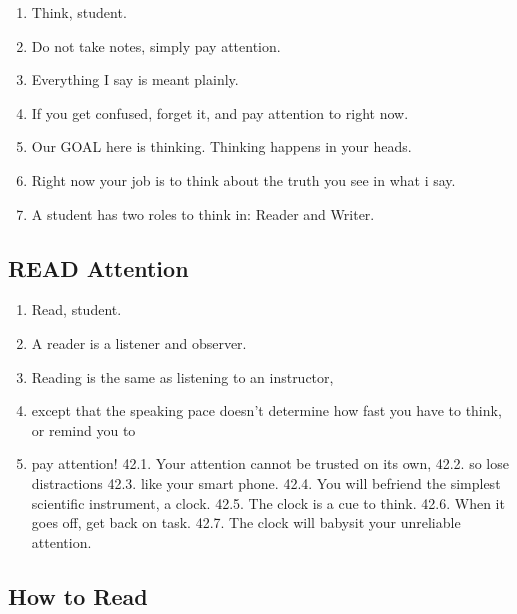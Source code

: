 \documentclass[
]{book}
\providecommand{\tightlist}{%
  \setlength{\itemsep}{0pt}\setlength{\parskip}{0pt}}
\begin{document}
\begin{enumerate}
\def\labelenumi{\arabic{enumi}.}
\setcounter{enumi}{30}
\tightlist
\item
  Think, student.
\item
  Do not take notes, simply pay attention.
\item
  Everything I say is meant plainly.
\item
  If you get confused, forget it, and pay attention to right now.
\item
  Our GOAL here is thinking. Thinking happens in your heads.
\item
  Right now your job is to think about the truth you see in what i say.
\item
  A student has two roles to think in: Reader and Writer.
\end{enumerate}

\hypertarget{read-attention}{%
\subsection{READ Attention}\label{read-attention}}

\begin{enumerate}
\def\labelenumi{\arabic{enumi}.}
\setcounter{enumi}{37}
\tightlist
\item
  Read, student.
\item
  A reader is a listener and observer.
\item
  Reading is the same as listening to an instructor,
\item
  except that the speaking pace doesn't determine how fast you have to think, or
  remind you to
\item
  pay attention!
  42.1. Your attention cannot be trusted on its own,
  42.2. so lose distractions
  42.3. like your smart phone.
  42.4. You will befriend the simplest scientific instrument, a clock.
  42.5. The clock is a cue to think.
  42.6. When it goes off, get back on task.
  42.7. The clock will babysit your unreliable attention.
\end{enumerate}

\hypertarget{how-to-read}{%
\subsection{How to Read}\label{how-to-read}}
\end{document}
